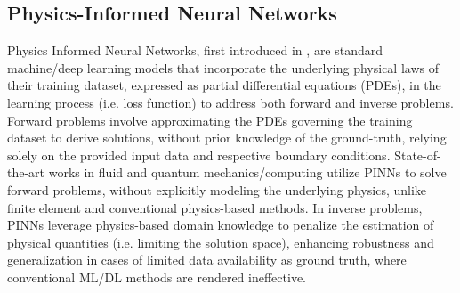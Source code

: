 

\subsection{Physics-Informed Neural Networks}

Physics Informed Neural Networks, first introduced in \cite{Raissi2017, Raissi2019}, are standard machine/deep learning models that incorporate the underlying physical laws of their training dataset, expressed as partial differential equations (PDEs), in the learning process (i.e. loss function) to address both forward and inverse problems. Forward problems involve approximating the PDEs governing the training dataset to derive solutions, without prior knowledge of the ground-truth, relying solely on the provided input data and respective boundary conditions. State-of-the-art works in fluid \cite{Mahmoudabadbozchelou2022, Eivazi2024} and quantum mechanics/computing \cite{Sedykh2024, Trahan2024} utilize PINNs to solve forward problems, without explicitly modeling the underlying physics, unlike finite element and conventional physics-based methods. In inverse problems, PINNs leverage physics-based domain knowledge to penalize the estimation of physical quantities (i.e. limiting the solution space), enhancing robustness and generalization in cases of limited data availability as ground truth, where conventional ML/DL methods are rendered ineffective. 

